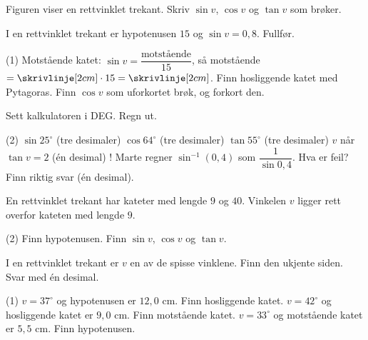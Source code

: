 
\begin{minipage}[t]{0.58\linewidth}
Figuren viser en rettvinklet trekant. Skriv $\sin v$, $\cos v$ og $\tan v$ som brøker.
\end{minipage}\hfill
\begin{minipage}[t]{0.38\linewidth}
\centering
{}
\end{minipage}

I en rettvinklet trekant er hypotenusen $15$ og $\sin v = 0,8$. Fullfør.
\begin{tasks}(1)
  \task Motstående katet: $\sin v = \dfrac{\text{motstående}}{15}$, så motstående $= \skrivlinje[2cm] \cdot 15 = \skrivlinje[2cm]$.
  \task Finn hosliggende katet med Pytagoras.
  \task Finn $\cos v$ som uforkortet brøk, og forkort den.
\end{tasks}

Sett kalkulatoren i DEG. Regn ut.
\begin{tasks}(2)
  \task $\sin 25^\circ$ (tre desimaler)
  \task $\cos 64^\circ$ (tre desimaler)
  \task $\tan 55^\circ$ (tre desimaler)
  \task $v$ når $\tan v = 2$ (én desimal)
  \task! Marte regner $\sin^{-1}(0,4)$ som $\dfrac{1}{\sin 0,4}$. Hva er feil? Finn riktig svar (én desimal).
\end{tasks}


En rettvinklet trekant har kateter med lengde $9$ og $40$. Vinkelen $v$ ligger rett overfor kateten med lengde $9$.
\begin{tasks}(2)
  \task Finn hypotenusen.
  \task Finn $\sin v$, $\cos v$ og $\tan v$.
\end{tasks}

I en rettvinklet trekant er $v$ en av de spisse vinklene. Finn den ukjente siden. Svar med én desimal.
\begin{tasks}(1)
  \task $v = 37^\circ$ og hypotenusen er $12,0$ cm. Finn hosliggende katet.
  \task $v = 42^\circ$ og hosliggende katet er $9,0$ cm. Finn motstående katet.
  \task $v = 33^\circ$ og motstående katet er $5,5$ cm. Finn hypotenusen.
\end{tasks}

